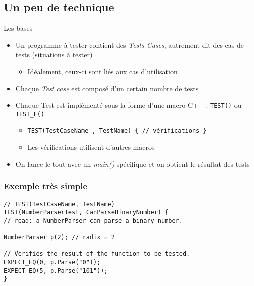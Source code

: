 \subsection{Un peu de technique}

\begin{frame}{Les bases}

\begin{itemize}
\itemsep1pt\parskip0pt
\item
  Un programme à tester contient des \emph{Tests Cases}, autrement dit
  des cas de tests (situations à tester)

  \begin{itemize}
  \itemsep1pt\parskip0pt
  \item
    Idéalement, ceux-ci sont liés aux cas d'utilisation
  \end{itemize}
\item
  Chaque \emph{Test case} est composé d'un certain nombre de
  tests
\item
  Chaque Test est implémenté sous la forme d'une macro C++ : \texttt{TEST()} ou
  \texttt{TEST\_F()}

  \begin{itemize}
  \itemsep1pt\parskip0pt
  \item
    \texttt{TEST(TestCaseName , TestName) \{ // vérifications \}}
  \item
    Les vérifications utilisent d'autres macros
  \end{itemize}
\item
  On lance le tout avec un \emph{main()} spécifique et on obtient le
  résultat des tests
\end{itemize}

\end{frame}

\begin{frame}[fragile]
\frametitle{Exemple très simple}
\begin{lstlisting}
// TEST(TestCaseName, TestName)
TEST(NumberParserTest, CanParseBinaryNumber) {
// read: a NumberParser can parse a binary number.

NumberParser p(2); // radix = 2

// Verifies the result of the function to be tested.
EXPECT_EQ(0, p.Parse("0"));
EXPECT_EQ(5, p.Parse("101"));
}
\end{lstlisting}
\end{frame}

